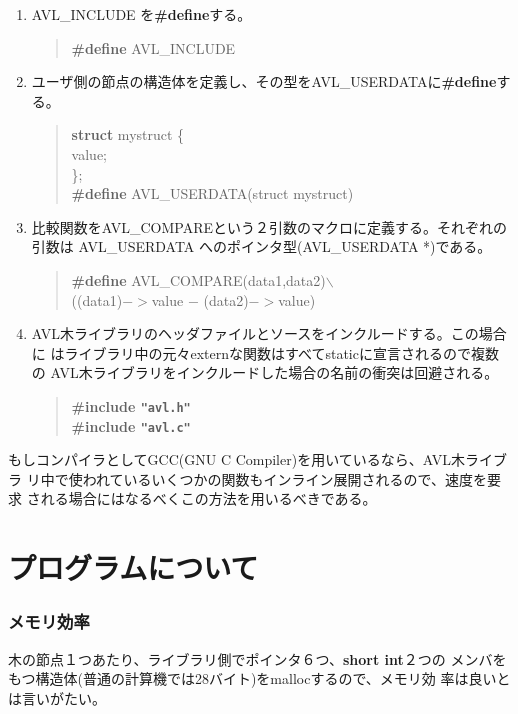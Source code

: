 \begin{enumerate}
\sloppy
\item
AVL\_INCLUDE を{\bf\#define}する。
\begin{quote}
{\bf\#define} AVL\_INCLUDE
\end{quote}
\item
ユーザ側の節点の構造体を定義し、その型をAVL\_USERDATAに{\bf\#define}す
る。
\begin{quote}
{\bf struct} mystruct \{\\
\hspace*{1cm}{\bf int} value;\\
\};\\
{\bf\#define} AVL\_USERDATA\hspace{1cm}(struct mystruct)
\end{quote}
\item
比較関数をAVL\_COMPAREという２引数のマクロに定義する。それぞれの引数は
AVL\_USERDATA へのポインタ型(AVL\_USERDATA *)である。
\begin{quote}
{\bf \#define} AVL\_COMPARE(data1,data2)$\backslash$\\
\hspace*{1cm}((data1)$->$value $-$ (data2)$->$value)
\end{quote}
\item
AVL木ライブラリのヘッダファイルとソースをインクルードする。この場合に
はライブラリ中の元々externな関数はすべてstaticに宣言されるので複数の
AVL木ライブラリをインクルードした場合の名前の衝突は回避される。
\begin{quote}
{\bf\#include \verb+"avl.h"+}\\
{\bf\#include \verb+"avl.c"+}
\end{quote}
\end{enumerate}

もしコンパイラとしてGCC(GNU C Compiler)を用いているなら、AVL木ライブラ
リ中で使われているいくつかの関数もインライン展開されるので、速度を要求
される場合にはなるべくこの方法を用いるべきである。

\section{プログラムについて}
\subsubsection{メモリ効率}
木の節点１つあたり、ライブラリ側でポインタ６つ、{\bf short int}２つの
メンバをもつ構造体(普通の計算機では28バイト)をmallocするので、メモリ効
率は良いとは言いがたい。

